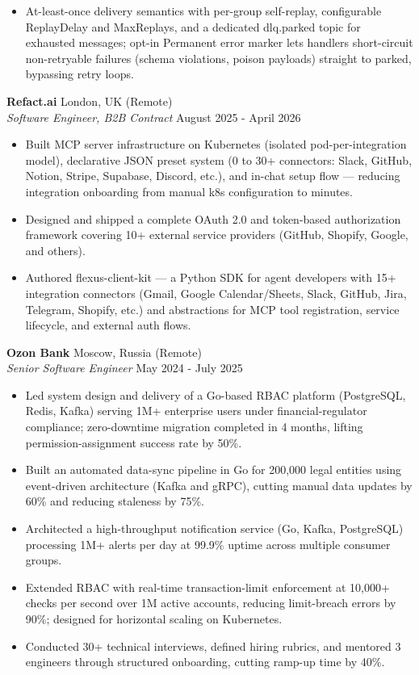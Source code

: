 \documentclass[11pt,a4paper]{article}
\newcommand{\jobentry}[4]{%
  \noindent\textbf{#1} \hfill #2\\
  \textit{#3} \hfill #4\par\vspace{2pt}
}
\begin{document}
\begin{itemize}
\item At-least-once delivery semantics with per-group self-replay, configurable ReplayDelay and MaxReplays, and a dedicated dlq.parked topic for exhausted messages; opt-in Permanent error marker lets handlers short-circuit non-retryable failures (schema violations, poison payloads) straight to parked, bypassing retry loops.
\end{itemize}

\jobentry{Refact.ai}{London, UK (Remote)}{Software Engineer, B2B Contract}{August 2025 - April 2026}
\begin{itemize}
\item Built MCP server infrastructure on Kubernetes (isolated pod-per-integration model), declarative JSON preset system (0 to 30+ connectors: Slack, GitHub, Notion, Stripe, Supabase, Discord, etc.), and in-chat setup flow --- reducing integration onboarding from manual k8s configuration to minutes.
\item Designed and shipped a complete OAuth 2.0 and token-based authorization framework covering 10+ external service providers (GitHub, Shopify, Google, and others).
\item Authored flexus-client-kit --- a Python SDK for agent developers with 15+ integration connectors (Gmail, Google Calendar/Sheets, Slack, GitHub, Jira, Telegram, Shopify, etc.) and abstractions for MCP tool registration, service lifecycle, and external auth flows.
\end{itemize}

\jobentry{Ozon Bank}{Moscow, Russia (Remote)}{Senior Software Engineer}{May 2024 - July 2025}
\begin{itemize}
\item Led system design and delivery of a Go-based RBAC platform (PostgreSQL, Redis, Kafka) serving 1M+ enterprise users under financial-regulator compliance; zero-downtime migration completed in 4 months, lifting permission-assignment success rate by 50\%.
\item Built an automated data-sync pipeline in Go for 200,000 legal entities using event-driven architecture (Kafka and gRPC), cutting manual data updates by 60\% and reducing staleness by 75\%.
\item Architected a high-throughput notification service (Go, Kafka, PostgreSQL) processing 1M+ alerts per day at 99.9\% uptime across multiple consumer groups.
\item Extended RBAC with real-time transaction-limit enforcement at 10,000+ checks per second over 1M active accounts, reducing limit-breach errors by 90\%; designed for horizontal scaling on Kubernetes.
\item Conducted 30+ technical interviews, defined hiring rubrics, and mentored 3 engineers through structured onboarding, cutting ramp-up time by 40\%.
\end{itemize}
\end{document}
